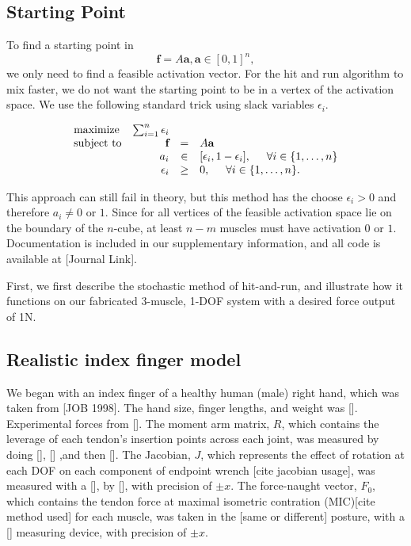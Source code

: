 \subsection{Starting Point}
To find a starting point in 
\[\textbf{f} = A\textbf{a}, \textbf{a} \in [0,1]^n,\]
we only need to find a feasible activation vector. For the hit and run algorithm to mix faster, we do not want the starting point to be in a vertex of the activation space. We use the following standard trick using slack variables $\epsilon_i$.

\begin{equation}\label{eq:LP_r}
\begin{array}{lrcl}
\mbox{maximize} & \sum_{i=1}^n \epsilon_i \\ 
\mbox{subject to} & \textbf{f} &=& A\textbf{a}\\
  & a_i &\in& [\epsilon_i, 1- \epsilon_i], \hspace{5mm} \forall i \in \{1,\dots,n\}  \\
  & \epsilon_i &\geq& 0, \hspace{5mm} \forall i \in \{1,\dots,n\}.  
\end{array}
\end{equation}

This approach can still fail in theory, but this method has the choose $\epsilon_i > 0$ and therefore $a_i \neq 0$ or $1$. Since for all vertices of the feasible activation space lie on the boundary of the $n$-cube, at least $n-m$ muscles must have activation $0$ or $1$. Documentation is included in our supplementary information, and all code is available at [Journal Link].

First, we first describe the stochastic method of hit-and-run, and illustrate how it functions on our fabricated 3-muscle, 1-DOF system with a desired force output of 1N.




\subsection{Realistic index finger model}
\label{ss:finger}
We began with an index finger of a healthy human (male) right hand, which was taken from [JOB 1998]. The hand size, finger lengths, and weight was []. Experimental forces from []. 
The moment arm matrix, $R$, which contains the leverage of each tendon's insertion points across each joint, was measured by doing [], [] ,and then [].
The Jacobian, $J$, which represents the effect of rotation at each DOF on each component of endpoint wrench [cite jacobian usage], was measured with a [], by [], with precision of $\pm x$.
The force-naught vector, $F_0$, which contains the tendon force at maximal isometric contration (MIC)[cite method used] for each muscle, was taken in the [same or different] posture, with a [] measuring device, with precision of $\pm x$.


